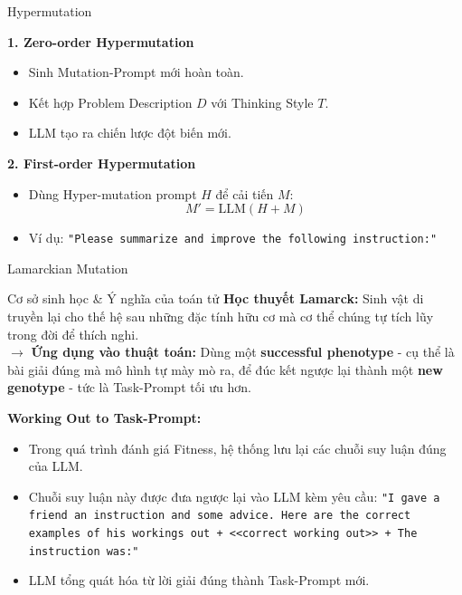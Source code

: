 \documentclass[english,main=vietnamese,xcolor=table]{beamer}
\begin{document}
\begin{frame}{Hypermutation}

\textbf{1. Zero-order Hypermutation}
\begin{itemize}
    \item Sinh Mutation-Prompt mới hoàn toàn.
    \item Kết hợp Problem Description $D$ với Thinking Style $T$.
    \item LLM tạo ra chiến lược đột biến mới.
\end{itemize}

\vspace{0.5em}

\textbf{2. First-order Hypermutation}
\begin{itemize}
    \item Dùng Hyper-mutation prompt $H$ để cải tiến $M$:
    \[
        M' = \text{LLM}(H + M)
    \]

    \item Ví dụ:
    \texttt{"Please summarize and improve the following instruction:"}
\end{itemize}

\end{frame}

\begin{frame}{Lamarckian Mutation}

\begin{block}{Cơ sở sinh học \& Ý nghĩa của toán tử}
\small
\textbf{Học thuyết Lamarck:} Sinh vật di truyền lại cho thế hệ sau những đặc tính hữu cơ mà cơ thể chúng tự tích lũy trong đời để thích nghi. \\
$\rightarrow$ \textbf{Ứng dụng vào thuật toán:} Dùng một \textbf{successful phenotype} - cụ thể là bài giải đúng mà mô hình tự mày mò ra, để đúc kết ngược lại thành một \textbf{new genotype} - tức là Task-Prompt tối ưu hơn.
\end{block}

\textbf{Working Out to Task-Prompt:}
\begin{itemize}
    \item Trong quá trình đánh giá Fitness, hệ thống lưu lại các chuỗi suy luận đúng của LLM.
    \item Chuỗi suy luận này được đưa ngược lại vào LLM kèm yêu cầu:
    \texttt{"I gave a friend an instruction and some advice. Here are the correct examples of his workings out + <<correct working out>> + The instruction was:"}
    \item LLM tổng quát hóa từ lời giải đúng thành Task-Prompt mới.
\end{itemize}

\end{frame}
\end{document}
